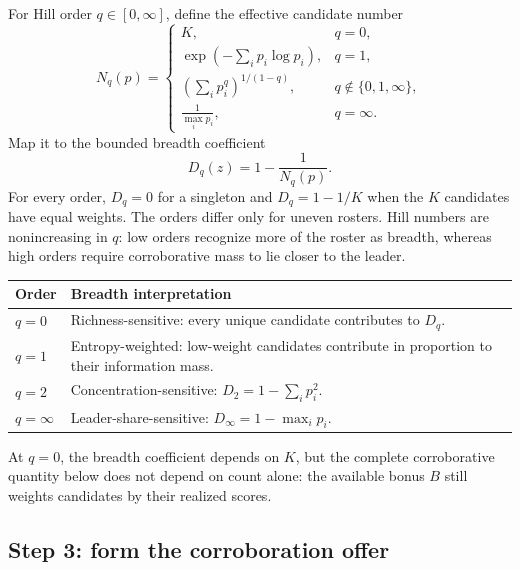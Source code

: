 \documentclass[11pt]{article}
\begin{document}
For Hill order $q\in[0,\infty]$, define the effective candidate number
\begin{equation}
N_q(p)=
\begin{cases}
K, & q=0,\\[3pt]
\displaystyle
\exp\!\left(-\sum_i p_i\log p_i\right), & q=1,\\[7pt]
\displaystyle
\left(\sum_i p_i^q\right)^{1/(1-q)},
& q\notin\{0,1,\infty\},\\[7pt]
\displaystyle
\frac{1}{\max_i p_i}, & q=\infty.
\end{cases}
\label{eq:hill-number}
\end{equation}
Map it to the bounded breadth coefficient
\begin{equation}
D_q(z)=1-\frac{1}{N_q(p)}.
\label{eq:hill-breadth}
\end{equation}
For every order, $D_q=0$ for a singleton and $D_q=1-1/K$ when the
$K$ candidates have equal weights. The orders differ only for uneven rosters.
Hill numbers are nonincreasing in $q$: low orders recognize more of the roster
as breadth, whereas high orders require corroborative mass to lie closer to
the leader.

\begin{center}
\small
\begin{tabularx}{0.92\textwidth}{@{}p{}>{\raggedright\arraybackslash}X@{}}
\toprule
Order & Breadth interpretation \\
\midrule
$q=0$ & Richness-sensitive: every unique candidate contributes to $D_q$. \\
$q=1$ & Entropy-weighted: low-weight candidates contribute in proportion to
their information mass. \\
$q=2$ & Concentration-sensitive: $D_2=1-\sum_i p_i^2$. \\
$q=\infty$ & Leader-share-sensitive: $D_\infty=1-\max_i p_i$. \\
\bottomrule
\end{tabularx}
\end{center}

At $q=0$, the breadth coefficient depends on $K$, but the complete
corroborative quantity below does not depend on count alone: the available
bonus $B$ still weights candidates by their realized scores.

\subsection{Step 3: form the corroboration offer}
\end{document}
